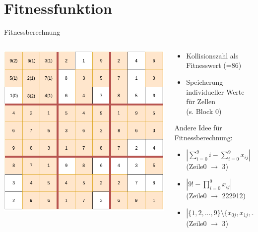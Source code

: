 \section{Fitnessfunktion}
\begin{frame}{Fitnessberechnung}
    \begin{columns}[T] %
        \begin{column}{0.75\textwidth}
            \includegraphics[width=\textwidth]{Pictures/Collision-Fitness.png}
        \end{column}
        \begin{column}{0.35\textwidth}
            \begin{itemize}
                \item Kollisionszahl als Fitnesswert (=86)
                \item Speicherung individueller Werte für Zellen \\
                (s. Block 0)
            \end{itemize}
            Andere Idee für Fitnessberechnung:
            \begin{itemize}
                \item \(|\sum_{i=0}^{9}i-\sum_{i=0}^{9}x_{ij}|\) (Zeile0 \(\rightarrow\) 3)
                \item \(|9!-\prod_{i=0}^{9}x_{ij}|\) (Zeile0 \(\rightarrow\) 222912)
                \item \(|\{1,2,...,9\}\setminus \{x_{0j},x_{1j},...,x_{8j}\}|\) (Zeile0 \(\rightarrow\) 3)
            \end{itemize}
        \end{column}
    \end{columns}
\end{frame}
